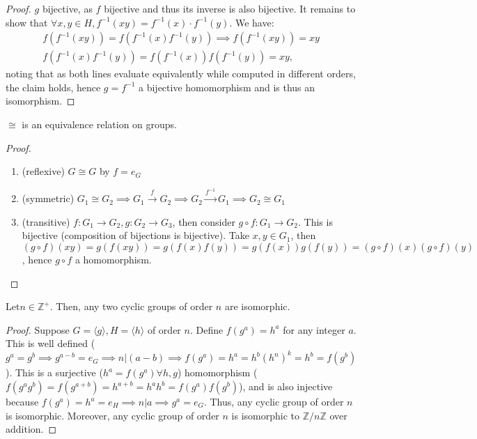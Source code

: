 \documentclass[12pt,oneside]{article}
\begin{document}
\begin{proof}
  $g$ bijective, as $f$ bijective and thus its inverse is also bijective. It remains to show that $\forall x,y \in H, f^{-1} (xy) = f^{-1}(x) \cdot f^{-1}(y)$. We have:
  \begin{align}
    f(f^{-1}(xy)) = f(f^{-1}(x)f^{-1}(y)) \implies f(f^{-1}(xy)) = xy\\
    f(f^{-1}(x)f^{-1}(y)) = f(f^{-1}(x))f(f^{-1}(y)) = xy,
  \end{align}
  noting that as both lines evaluate equivalently while computed in different orders, the claim holds, hence $g = f^{-1}$ a bijective homomorphism and is thus an isomorphism.
\end{proof}

\begin{proposition}
  $\cong$ is an equivalence relation on groups.
\end{proposition}
\begin{proof}
\begin{enumerate}
  \item (reflexive) $G \cong G$ by $f = e_G$
  \item (symmetric) $G_1 \cong G_2 \implies G_1 \overset{f}{\to} G_2 \implies G_2 \overset{f^{-1}}{\to} G_1 \implies G_2 \cong G_1$
  \item (transitive) $f: G_1 \to G_2, g: G_2 \to G_3$, then consider $g \circ f : G_1 \to G_2$. This is bijective (composition of bijections is bijective). Take $x, y \in G_1$, then $(g\circ f)(xy) = g(f(xy)) = g(f(x)f(y)) = g(f(x))g(f(y)) = (g \circ f)(x) (g\circ f)(y)$, hence $g\circ f$ a homomorphism.
\end{enumerate}  
\end{proof}

\begin{proposition}[Cyclic; $\abs{G} = \abs{H} = n \implies G \cong H$]
  Let\footnotemark $n \in \mathbb{Z}^{+}$. Then, any two cyclic groups of order $n$ are isomorphic.
\end{proposition}
  \begin{proof}
    Suppose $G = \langle g\rangle, H = \langle h\rangle$ of order $n$. Define $f(g^{a}) = h^a$ for any integer $a$. This is well defined ($g^{a} = g^{b} \implies g^{a-b} = e_G \implies n | (a-b) \implies f(g^{a}) = h^a = h^{b}(h^{n})^k = h^b = f(g^b)$). This is a surjective ($h^a = f(g^a) \forall h,g$) homomorphism ($f(g^ag^b) = f(g^{a+b}) = h^{a+b}=h^{a}h^{b}=f(g^a)f(g^b)$), and is also injective because $f(g^{a}) = h^a = e_H \implies n | a \implies g^{a} = e_G$.
    Thus, any cyclic group of order $n$ is isomorphic. Moreover, any cyclic group of order $n$ is isomorphic to $\mathbb{Z}/n\mathbb{Z}$ over addition.
\end{proof}
\end{document}
